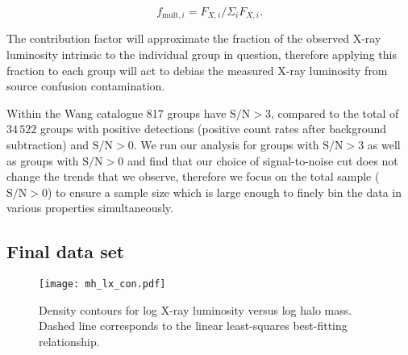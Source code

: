\begin{equation}
  f_{\mathrm{mult},i} = F_{X,i} / \Sigma_i F_{X,i}.
\end{equation}

\noindent
The contribution factor will approximate the fraction of the observed
X-ray luminosity intrinsic to the individual group in question,
therefore applying this fraction to each group will act to debias the
measured X-ray luminosity from source confusion contamination.
\par
Within the Wang catalogue 817 groups have $\mathrm{S/N} > 3$, compared
to the total of $34\,522$ groups with positive detections (positive
count rates after background subtraction) and $\mathrm{S/N} > 0$.  We
run our analysis for groups with $\mathrm{S/N} > 3$ as well as groups
with $\mathrm{S/N} > 0$ and find that our choice of signal-to-noise
cut does not change the trends that we observe, therefore we focus on
the total sample ($\mathrm{S/N} > 0$) to ensure a sample size which is
large enough to finely bin the data in various properties
simultaneously.

\subsection{Final data set}

\begin{figure}[!tp]
  \centering
  \texttt{[image: mh\_lx\_con.pdf]}
  \caption{Density contours for log X-ray luminosity versus log halo
    mass.  Dashed line corresponds to the linear least-squares
    best-fitting relationship.}
  \label{fig:mh_lx_con}
\end{figure}

